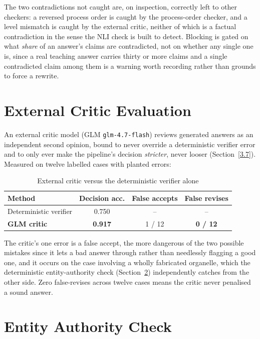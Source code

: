 The two contradictions not caught are, on inspection, correctly left to
other checkers: a reversed process order is caught by the process-order
checker, and a level mismatch is caught by the external critic, neither of
which is a factual contradiction in the sense the NLI check is built to
detect. Blocking is gated on what \emph{share} of an answer's claims are
contradicted, not on whether any single one is, since a real teaching
answer carries thirty or more claims and a single contradicted claim among
them is a warning worth recording rather than grounds to force a rewrite.

\section{External Critic Evaluation}\label{4.7}

An external critic model (GLM \texttt{glm-4.7-flash}) reviews generated
answers as an independent second opinion, bound to never override a
deterministic verifier error and to only ever make the pipeline's decision
\emph{stricter}, never looser (Section~\ref{3.7}). Measured on twelve
labelled cases with planted errors:

\begin{table}[h]
\centering
\caption{External critic versus the deterministic verifier alone}
\label{tab:4.5}
\begin{tabular}{@{}lccc@{}}
\toprule
\textbf{Method} & \textbf{Decision acc.} & \textbf{False accepts} & \textbf{False revises} \\
\midrule
Deterministic verifier & 0.750 & -- & -- \\
\textbf{GLM critic} & \textbf{0.917} & 1 / 12 & \textbf{0 / 12} \\
\bottomrule
\end{tabular}
\end{table}

The critic's one error is a false accept, the more dangerous of the two
possible mistakes since it lets a bad answer through rather than
needlessly flagging a good one, and it occurs on the case involving a
wholly fabricated organelle, which the deterministic entity-authority
check (Section~\ref{4.8}) independently catches from the other side. Zero
false-revises across twelve cases means the critic never penalised a sound
answer.

\section{Entity Authority Check}\label{4.8}

